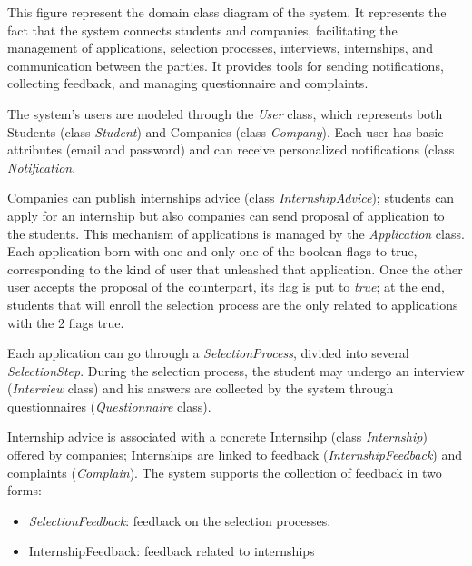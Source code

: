 			This figure represent the domain class diagram of the system. It represents the fact that the system connects students and companies, facilitating the management of applications, selection processes, interviews, internships, and communication between the parties. It provides tools for sending notifications, collecting feedback, and managing questionnaire and complaints.
			
			The system's users are modeled through the \textit{User} class, which represents both Students (class \textit{Student}) and Companies (class \textit{Company}). Each user has basic attributes (email and password) and can receive personalized notifications (class \textit{Notification}.
			
			Companies can publish internships advice (class \textit{InternshipAdvice}); students can apply for an internship but also companies can send proposal of application to the students. This mechanism of applications is managed by the \textit{Application} class. Each application born with one and only one of the boolean flags to true, corresponding to the kind of user that unleashed that application. Once the other user accepts the proposal of the counterpart, its flag is put to \textit{true}; at the end, students that will enroll the selection process are the only related to applications with the 2 flags true.
			
			Each application can go through a \textit{SelectionProcess}, divided into several \textit{SelectionStep}. During the selection process, the student may undergo an interview (\textit{Interview} class) and his answers are collected by the system through questionnaires (\textit{Questionnaire} class).
			
			Internship advice is associated with a concrete Internsihp (class \textit{Internship}) offered by companies; Internships are linked to feedback (\textit{InternshipFeedback}) and complaints (\textit{Complain}). 
			The system supports the collection of feedback in two forms:
			\begin{itemize}
				\item \textit{SelectionFeedback}: feedback on the selection processes.
				\item {InternshipFeedback}: feedback related to internships
			
			\end{itemize}
			
			
			
			
			
			
			
